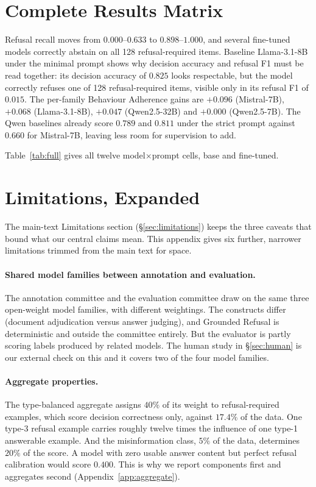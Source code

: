 \section{Complete Results Matrix}
\label{app:full}

Refusal recall moves from $0.000$--$0.633$ to $0.898$--$1.000$, and several
fine-tuned models correctly abstain on all 128 refusal-required items. Baseline
Llama-3.1-8B under the minimal prompt shows why decision accuracy and refusal F1
must be read together: its decision accuracy of $0.825$ looks respectable, but
the model correctly refuses one of 128 refusal-required items, visible only in
its refusal F1 of $0.015$. The per-family Behaviour Adherence gains are $+0.096$
(Mistral-7B), $+0.068$ (Llama-3.1-8B), $+0.047$ (Qwen2.5-32B) and $+0.000$
(Qwen2.5-7B). The Qwen baselines already score $0.789$ and $0.811$ under the
strict prompt against $0.660$ for Mistral-7B, leaving less room for supervision
to add.

Table~\ref{tab:full} gives all twelve model$\times$prompt cells, base and fine-tuned.



\section{Limitations, Expanded}
\label{app:limitations-expanded}

The main-text Limitations section (\S\ref{sec:limitations}) keeps the three
caveats that bound what our central claims mean. This appendix gives six
further, narrower limitations trimmed from the main text for space.

\paragraph{Shared model families between annotation and evaluation.} The
annotation committee and the evaluation committee draw on the same three
open-weight model families, with different weightings. The constructs differ
(document adjudication versus answer judging), and Grounded Refusal is
deterministic and outside the committee entirely. But the evaluator is partly
scoring labels produced by related models. The human study in \S\ref{sec:human}
is our external check on this and it covers two of the four model families.

\paragraph{Aggregate properties.} The type-balanced aggregate assigns $40\%$ of
its weight to refusal-required examples, which score decision correctness only,
against $17.4\%$ of the data. One type-3 refusal example carries roughly twelve
times the influence of one type-1 answerable example. And the misinformation
class, $5\%$ of the data, determines $20\%$ of the score. A model with zero
usable answer content but perfect refusal calibration would score $0.400$. This
is why we report components first and aggregates second
(Appendix~\ref{app:aggregate}).

